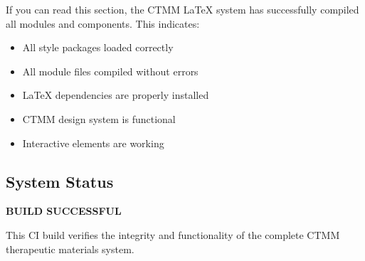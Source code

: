 \documentclass[a4paper,12pt]{article}
\begin{document}
If you can read this section, the CTMM LaTeX system has successfully compiled all modules and components. This indicates:

\begin{itemize}
\item All style packages loaded correctly
\item All module files compiled without errors
\item LaTeX dependencies are properly installed
\item CTMM design system is functional
\item Interactive elements are working
\end{itemize}

\subsection{System Status}
\begin{center}
\textcolor{ctmmGreen}{\faCheckCircle} \textbf{BUILD SUCCESSFUL}
\end{center}

This CI build verifies the integrity and functionality of the complete CTMM therapeutic materials system.
\end{document}

